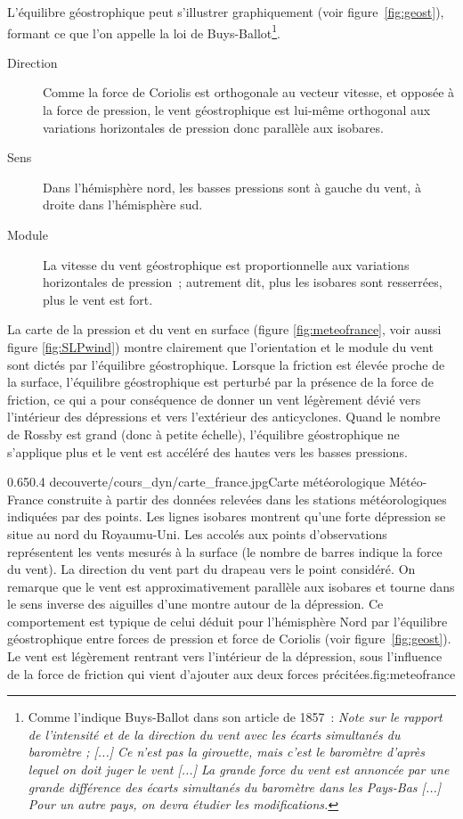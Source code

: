 \sk
L'équilibre géostrophique peut s'illustrer graphiquement (voir figure~\ref{fig:geost}), formant ce que l'on appelle la loi de Buys-Ballot\footnote{Comme l'indique Buys-Ballot dans son article de 1857~: \emph{Note sur le rapport de l'intensité et de la direction du vent avec les écarts simultanés du baromètre ; [...] Ce n'est pas la girouette, mais c'est le baromètre d'après lequel on doit juger le vent [...] La grande force du vent est annoncée par une grande différence des écarts simultanés du baromètre dans les Pays-Bas [...] Pour un autre pays, on devra étudier les modifications.}}.
\begin{description}
\item[Direction] Comme la force de Coriolis est orthogonale au vecteur vitesse, et opposée à la force de pression, le vent géostrophique est lui-même orthogonal aux variations horizontales de pression donc parallèle aux isobares.
\item[Sens] Dans l'hémisphère nord, les basses pressions sont à gauche du vent, à droite dans l'hémisphère sud.
\item[Module] La vitesse du vent géostrophique est proportionnelle aux variations horizontales de pression~; autrement dit, plus les isobares sont resserrées, plus le vent est fort.
\end{description}
La carte de la pression et du vent en surface (figure \ref{fig:meteofrance}, voir aussi figure \ref{fig:SLPwind}) montre clairement que l'orientation et le module du vent sont dictés par l'équilibre géostrophique. Lorsque la friction est élevée proche de la surface, l'équilibre géostrophique est perturbé par la présence de la force de friction, ce qui a pour conséquence de donner un vent légèrement dévié vers l'intérieur des dépressions et vers l'extérieur des anticyclones. Quand le nombre de Rossby est grand (donc à petite échelle), l'équilibre géostrophique ne s'applique plus et le vent est accéléré des hautes vers les basses pressions. 

\figside
{0.65}{0.4}
{decouverte/cours_dyn/carte_france.jpg}{Carte météorologique Météo-France construite à partir des données relevées dans les stations météorologiques indiquées par des points. Les lignes isobares montrent qu'une forte dépression se situe au nord du Royaumu-Uni. Les  accolés aux points d'observations représentent les vents mesurés à la surface (le nombre de barres indique la force du vent). La direction du vent part du drapeau vers le point considéré. On remarque que le vent est approximativement parallèle aux isobares et tourne dans le sens inverse des aiguilles d'une montre autour de la dépression. Ce comportement est typique de celui déduit pour l'hémisphère Nord par l'équilibre géostrophique entre forces de pression et force de Coriolis (voir figure~\ref{fig:geost}). Le vent est légèrement rentrant vers l'intérieur de la dépression, sous l'influence de la force de friction qui vient d'ajouter aux deux forces précitées.}{fig:meteofrance}

